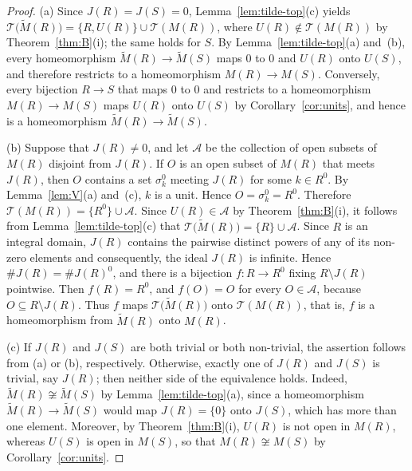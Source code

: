 \documentclass[12pt,reqno,a4paper]{amsart}
\theoremstyle{plain}
\theoremstyle{definition}
\begin{document}
\begin{proof}
(a) Since $J(R)=J(S)=0$, Lemma~\ref{lem:tilde-top}(c) yields $\mathcal{T}\bigl(\widetilde{M}(R)\bigr)=\{R,U(R)\}\cup\mathcal{T}(M(R))$, where $U(R)\notin\mathcal{T}(M(R))$ by Theorem~\ref{thm:B}(i); the same holds for $S$. By Lemma~\ref{lem:tilde-top}(a) and~(b), every homeomorphism $\widetilde{M}(R)\to\widetilde{M}(S)$ maps $0$ to $0$ and $U(R)$ onto $U(S)$, and therefore restricts to a homeomorphism $M(R)\to M(S)$. Conversely, every bijection $R\to S$ that maps $0$ to $0$ and restricts to a homeomorphism $M(R)\to M(S)$ maps $U(R)$ onto $U(S)$ by Corollary~\ref{cor:units}, and hence is a homeomorphism $\widetilde{M}(R)\to\widetilde{M}(S)$.


(b) Suppose that $J(R)\neq0$, and let $\mathcal{A}$ be the collection of open subsets of $M(R)$ disjoint from $J(R)$. If $O$ is an open subset of $M(R)$ that meets $J(R)$, then $O$ contains a set $\sigma_k^0$ meeting $J(R)$ for some $k\in R^0$. By Lemma~\ref{lem:V}(a) and~(c), $k$ is a unit. Hence $O=\sigma_k^0=R^0$. Therefore $\mathcal{T}(M(R))=\{R^0\}\cup\mathcal{A}$. Since $U(R)\in\mathcal{A}$ by Theorem~\ref{thm:B}(i), it follows from Lemma~\ref{lem:tilde-top}(c) that $\mathcal{T}\bigl(\widetilde{M}(R)\bigr)=\{R\}\cup\mathcal{A}$. Since $R$ is an integral domain, $J(R)$ contains the pairwise distinct powers of any of its non-zero elements and consequently, the ideal $J(R)$ is infinite. Hence $\#J(R)=\#J(R)^0$, and there is a bijection $f\colon R\to R^0$ fixing $R\setminus J(R)$ pointwise. Then $f(R)=R^0$, and $f(O)=O$ for every $O\in\mathcal{A}$, because $O\subseteq R\setminus J(R)$. Thus $f$ maps $\mathcal{T}\bigl(\widetilde{M}(R)\bigr)$ onto $\mathcal{T}(M(R))$, that is, $f$ is a homeomorphism from $\widetilde{M}(R)$ onto $M(R)$.

(c) If $J(R)$ and $J(S)$ are both trivial or both non-trivial, the assertion follows from (a) or (b), respectively. Otherwise, exactly one of $J(R)$ and $J(S)$ is trivial, say $J(R)$; then neither side of the equivalence holds. Indeed, $\widetilde{M}(R)\not\cong\widetilde{M}(S)$ by Lemma~\ref{lem:tilde-top}(a), since a homeomorphism $\widetilde{M}(R)\to\widetilde{M}(S)$ would map $J(R)=\{0\}$ onto $J(S)$, which has more than one element. Moreover, by Theorem~\ref{thm:B}(i), $U(R)$ is not open in $M(R)$, whereas $U(S)$ is open in $M(S)$, so that $M(R)\not\cong M(S)$ by Corollary~\ref{cor:units}.
\end{proof}
\end{document}
